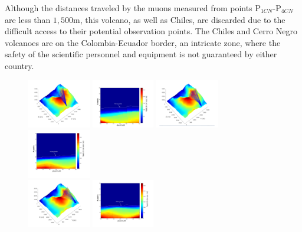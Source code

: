 \documentclass[letterpaper,10pt,titlepage,linenumber]{article}
\begin{document}
Although the distances traveled by the muons measured from points P$_{1CN}$-P$_{4CN}$ are less than $1,500$m, this volcano, as well as Chiles, are discarded due to the difficult access to their potential observation points. The Chiles and Cerro Negro volcanoes are on the Colombia-Ecuador border, an intricate zone, where the safety of the scientific personnel and equipment is not guaranteed by either country. 
\begin{figure}[!ht]
\centering
\includegraphics[width=0.245\textwidth]{Figures/Paths1CN}
\includegraphics[width=0.245\textwidth]{Figures/Distance1CN}
\includegraphics[width=0.245\textwidth]{Figures/Paths2CN}
\includegraphics[width=0.245\textwidth]{Figures/Distance2CN}\\
\includegraphics[width=0.245\textwidth]{Figures/Paths3CN}
\includegraphics[width=0.245\textwidth]{Figures/Distance3CN}

\end{figure}
\end{document}
